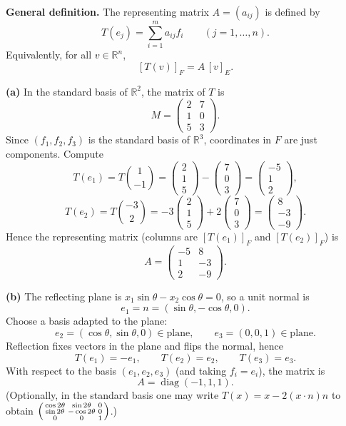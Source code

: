 \begin{solution}
\textbf{General definition.} The representing matrix $A=(a_{ij})$ is defined by
\[
T(e_j)=\sum_{i=1}^m a_{ij} f_i\qquad (j=1,\dots,n).
\]
Equivalently, for all $v\in\mathbb R^n$,
\[
[T(v)]_F = A\,[v]_E.
\]

\textbf{(a)} In the standard basis of $\mathbb R^2$, the matrix of $T$ is
\[
M=\begin{pmatrix}2&7\\1&0\\5&3\end{pmatrix}.
\]
Since $(f_1,f_2,f_3)$ is the standard basis of $\mathbb R^3$, coordinates in $F$ are just components. Compute
\[
T(e_1)=T\binom{1}{-1}
=\begin{pmatrix}2\\1\\5\end{pmatrix}-\begin{pmatrix}7\\0\\3\end{pmatrix}
=\begin{pmatrix}-5\\1\\2\end{pmatrix},
\]
\[
T(e_2)=T\binom{-3}{2}
=-3\begin{pmatrix}2\\1\\5\end{pmatrix}+2\begin{pmatrix}7\\0\\3\end{pmatrix}
=\begin{pmatrix}8\\-3\\-9\end{pmatrix}.
\]
Hence the representing matrix (columns are $[T(e_1)]_F$ and $[T(e_2)]_F$) is
\[
\boxed{
	A=\begin{pmatrix}
		-5&8\\
		1&-3\\
		2&-9
	\end{pmatrix}.}
\]

\textbf{(b)} The reflecting plane is $x_1\sin\theta-x_2\cos\theta=0$, so a unit normal is
\[
e_1=n=(\sin\theta,-\cos\theta,0).
\]
Choose a basis adapted to the plane:
\[
e_2=(\cos\theta,\sin\theta,0)\in \text{plane},\qquad e_3=(0,0,1)\in \text{plane}.
\]
Reflection fixes vectors in the plane and flips the normal, hence
\[
T(e_1)=-e_1,\qquad T(e_2)=e_2,\qquad T(e_3)=e_3.
\]
With respect to the basis $(e_1,e_2,e_3)$ (and taking $f_i=e_i$), the matrix is
\[
\boxed{A=\operatorname{diag}(-1,1,1).}
\]
(Optionally, in the standard basis one may write $T(x)=x-2(x\cdot n)n$ to obtain
$\begin{psmallmatrix}
	\cos 2\theta & \sin 2\theta & 0\\
	\sin 2\theta & -\cos 2\theta & 0\\
	0&0&1
\end{psmallmatrix}$.)


\end{solution}
